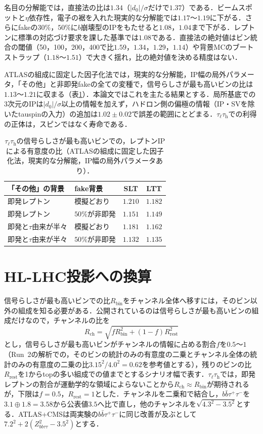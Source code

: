 \documentclass[paper=a4,fontsize=10pt,jafontsize=10pt,line_length=44zw,number_of_lines=46]{jlreq}
\newcommand{\tauh}{\tau_{\mathrm{h}}}
\newcommand{\taul}{\tau_{\ell}}
\newcommand{\bbtt}{b\bar b\tau^+\tau^-}
\begin{document}
名目の分解能では，直接法の比は$1.34$（$|d_0|/\sigma$だけで$1.37$）である．ビームスポットと$\eta$依存性，電子の裾を入れた現実的な分解能では$1.17$〜$1.19$に下がる．さらにfakeの$30\%$，$50\%$に$b$崩壊型のIPをもたせると$1.08$，$1.04$まで下がる．レプトンに標準の対応づけ要求を課した基準では$1.08$である．直接法の絶対値はビン統合の閾値（50，100，200，400で比$1.59$，$1.34$，$1.29$，$1.14$）や背景MCのブートストラップ（$1.18$〜$1.51$）で大きく揺れ，比の絶対値を決める精度はない．

ATLASの組成に固定した因子化法では，現実的な分解能，IP幅の局外パラメータ，「その他」と非即発fakeの全ての変種で，信号らしさが最も高いビンの比は$1.13$〜$1.21$に収まる（表\ref{tab:lephad}）．本論文ではこれを主たる結果とする．局所基底での3次元のIPは$|d_0|/\sigma$以上の情報を加えず，ハドロン側の偏極の情報（IP・SVを除いたtauspinの入力）の追加は$1.02\pm0.02$で誤差の範囲にとどまる．$\taul\tauh$での利得の正体は，スピンではなく寿命である．

\begin{table}[t]
  \centering
  \caption{$\taul\tauh$の信号らしさが最も高いビンでの，レプトンIPによる有意度の比（ATLASの組成に固定した因子化法，現実的な分解能，IP幅の局外パラメータあり）．}
  \label{tab:lephad}
  \begin{tabular}{llcc}
    \toprule
    「その他」の背景 & fake背景 & SLT & LTT \\
    \midrule
    即発レプトン & 模擬どおり & $1.210$ & $1.182$ \\
    即発レプトン & $50\%$が非即発 & $1.151$ & $1.149$ \\
    即発と$\tau$由来が半々 & 模擬どおり & $1.181$ & $1.162$ \\
    即発と$\tau$由来が半々 & $50\%$が非即発 & $1.132$ & $1.135$ \\
    \bottomrule
  \end{tabular}
\end{table}

\section{HL-LHC投影への換算}\label{sec:proj}

信号らしさが最も高いビンでの比$R_{\mathrm{bin}}$をチャンネル全体へ移すには，そのビン以外の組成を知る必要がある．公開されているのは信号らしさが最も高いビンの組成だけなので，チャンネルの比を
\begin{equation}
  R_{\mathrm{ch}}=\sqrt{f R_{\mathrm{bin}}^2+(1-f)R_{\mathrm{rest}}^2}
\end{equation}
とし，信号らしさが最も高いビンがチャンネルの情報に占める割合$f$を$0.5$〜$1$（Run~2の解析での，そのビンの統計のみの有意度の二乗とチャンネル全体の統計のみの有意度の二乗の比$3.15^2/4.0^2=0.62$を参考値とする），残りのビンの比$R_{\mathrm{rest}}$を1からtopの多い組成での値までとするシナリオ幅で表す．$\taul\tauh$では，即発レプトンの割合が運動学的な領域によらないことから$R_{\mathrm{ch}}\approx R_{\mathrm{bin}}$が期待されるが，下限は$f=0.5$，$R_{\mathrm{rest}}=1$とした．チャンネルを二乗和で結合し，$\bbtt$を$3.1\oplus1.8=3.58$から公表値$3.5$へ比で直し，他のチャンネルを$\sqrt{4.3^2-3.5^2}$とする．ATLAS+CMSは両実験の$\bbtt$に同じ改善が及ぶとして$7.2^2+2(Z_{bb\tau\tau}^2-3.5^2)$とする．
\end{document}
